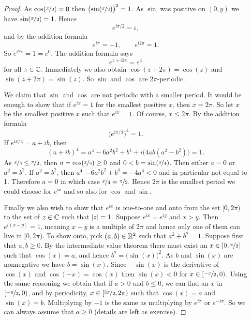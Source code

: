 \begin{proof}
As $\cos(\nicefrac{\pi}{2}) = 0$ then
${\bigl(\sin(\nicefrac{\pi}{2})\bigr)}^2 = 1$.
As $\sin$ was positive on $(0,y)$ we have
$\sin(\nicefrac{\pi}{2}) = 1$.
Hence
\begin{equation*}
e^{i \pi /2} = i ,
\end{equation*}
and by the addition formula 
\begin{equation*}
e^{i \pi} = -1 ,
\qquad 
e^{i 2\pi} = 1 .
\end{equation*}
So $e^{i2\pi} = 1 = e^0$.  The addition formula says
\begin{equation*}
e^{z+i2\pi} = e^z
\end{equation*}
for all $z \in {\mathbb{C}}$.  Immediately we also obtain
$\cos(z+2\pi) = \cos(z)$ and $\sin(z+2\pi) = \sin(z)$.
So $\sin$ and $\cos$ are $2\pi$-periodic.

We claim that $\sin$ and $\cos$ are not periodic with a smaller period.  It
would be enough to show that if $e^{ix} = 1$ for the
smallest positive $x$, then
$x = 2\pi$.  So let $x$ be the smallest positive $x$ such that
$e^{ix} = 1$.
Of course, $x \leq 2\pi$.
By the addition formula
\begin{equation*}
{\bigl(e^{ix/4}\bigr)}^4 = 1 .
\end{equation*}
If $e^{ix/4} = a+ib$, then
\begin{equation*}
{(a+ib)}^4
=a^4-6a^2b^2+b^4 + i\bigl(4ab(a^2-b^2)\bigr)
=1 .
\end{equation*}
As $\nicefrac{x}{4} \leq \nicefrac{\pi}{2}$, then $a = \cos(\nicefrac{x}{4}) \geq 0$ and
$0 < b = \sin(\nicefrac{x}{4})$.  Then either $a = 0$ 
or $a^2 = b^2$.  If $a^2=b^2$, then
$a^4-6a^2b^2+b^4 = -4a^4 < 0$ and in particular not equal to 1.
Therefore $a=0$ in which case $\nicefrac{x}{4} = \nicefrac{\pi}{2}$.
Hence $2\pi$ is the smallest period we could choose for $e^{ix}$
and so also for $\cos$ and $\sin$.

Finally we also wish to show that $e^{ix}$ is one-to-one and onto
from the set $[0,2\pi)$ to the set of $z \in {\mathbb{C}}$ such that
$\lvert {z} \rvert = 1$.  Suppose $e^{ix} = e^{iy}$ and 
$x > y$.  Then
$e^{i(x-y)} = 1$, meaning $x-y$ is a multiple of $2\pi$ and hence
only one of them can live in $[0,2\pi)$.
To show onto, pick $(a,b) \in {\mathbb{R}}^2$ such that $a^2+b^2 = 1$.
Suppose first that $a,b \geq 0$.  By the intermediate value theorem
there must exist an $x \in [0,\nicefrac{\pi}{2}]$ such that
$\cos(x) = a$, and hence $b^2 = \bigl(\sin(x)\bigr)^2$.  As
$b$ and $\sin(x)$ are nonnegative we have $b = \sin(x)$.
Since $-\sin(x)$ is the derivative of $\cos(x)$
and $\cos(-x) = \cos(x)$ then $\sin(x) < 0$ for $x \in [\nicefrac{-\pi}{2},0)$.
Using the same reasoning we obtain that
if $a > 0$ and $b \leq 0$, we can find an $x$ in $[\nicefrac{-\pi}{2},0)$,
and by periodicity,
$x \in [\nicefrac{3\pi}{2},2\pi)$ such that $\cos(x) = a$ and $\sin(x)=b$.
Multiplying by $-1$ is the same as multiplying by $e^{i\pi}$ or
$e^{-i\pi}$.  So we can always assume that $a \geq 0$ (details are left
as exercise).
\end{proof}

